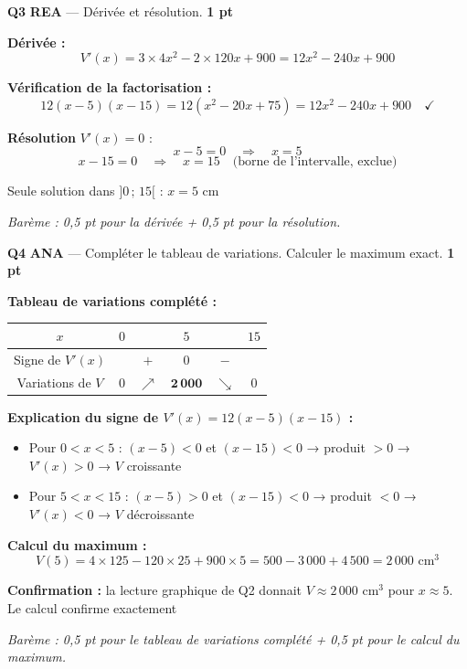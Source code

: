 \documentclass[a4paper,11pt]{article}
\newcommand{\pts}[1]{\hfill\textcolor{gris}{\small\textbf{#1}}}
\newcommand{\comp}[1]{\colorbox{blue!10}{\scriptsize\textbf{#1}}}
\begin{document}
\textbf{Q3} \comp{REA} — Dérivée et résolution. \pts{1 pt}

\begin{corrbox}
\textbf{Dérivée :}
\[
V'(x) = 3 \times 4x^2 - 2 \times 120x + 900 = 12x^2 - 240x + 900
\]

\textbf{Vérification de la factorisation :}
\[
12(x-5)(x-15) = 12(x^2 - 20x + 75) = 12x^2 - 240x + 900 \quad \checkmark
\]

\textbf{Résolution} $V'(x) = 0$ :
\[
x - 5 = 0 \quad \Rightarrow \quad \boxed{x = 5}
\]
\[
x - 15 = 0 \quad \Rightarrow \quad x = 15 \quad \text{(borne de l'intervalle, exclue)}
\]

Seule solution dans $]0\,;\,15[$ : $\boxed{x = 5 \text{ cm}}$

\smallskip
\textit{Barème : 0,5 pt pour la dérivée + 0,5 pt pour la résolution.}
\end{corrbox}

\textbf{Q4} \comp{ANA} — Compléter le tableau de variations. Calculer le maximum exact. \pts{1 pt}

\begin{corrbox}
\textbf{Tableau de variations complété :}

\begin{center}
\renewcommand{\arraystretch}{2.2}
\begin{tabular}{|c|c|c|c|c|c|}
\hline
$x$ & $0$ & & $5$ & & $15$ \\
\hline
Signe de $V'(x)$ & & $\boldsymbol{+}$ & $0$ & $\boldsymbol{-}$ & \\
\hline
Variations de $V$ & $0$ & $\nearrow$ & $\boldsymbol{2\,000}$ & $\searrow$ & $0$ \\
\hline
\end{tabular}
\renewcommand{\arraystretch}{1}
\end{center}

\textbf{Explication du signe de $V'(x) = 12(x-5)(x-15)$ :}
\begin{itemize}[nosep]
  \item Pour $0 < x < 5$ : $(x-5) < 0$ et $(x-15) < 0$ → produit $> 0$ → $V'(x) > 0$ → $V$ croissante
  \item Pour $5 < x < 15$ : $(x-5) > 0$ et $(x-15) < 0$ → produit $< 0$ → $V'(x) < 0$ → $V$ décroissante
\end{itemize}

\textbf{Calcul du maximum :}
\[
V(5) = 4 \times 125 - 120 \times 25 + 900 \times 5 = 500 - 3\,000 + 4\,500 = \boxed{2\,000 \text{ cm}^3}
\]

\textbf{Confirmation :} la lecture graphique de Q2 donnait $V \approx 2\,000$ cm$^3$ pour $x \approx 5$. Le calcul confirme exactement \checkmark

\smallskip
\textit{Barème : 0,5 pt pour le tableau de variations complété + 0,5 pt pour le calcul du maximum.}
\end{corrbox}
\end{document}
